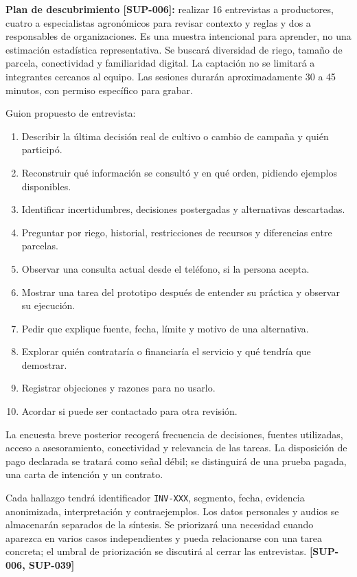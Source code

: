 \documentclass[10pt,a4paper]{article}
\begin{document}
\textbf{Plan de descubrimiento [SUP-006]:} realizar 16 entrevistas a productores, cuatro a especialistas agronómicos para revisar contexto y reglas y dos a responsables de organizaciones. Es una muestra intencional para aprender, no una estimación estadística representativa. Se buscará diversidad de riego, tamaño de parcela, conectividad y familiaridad digital. La captación no se limitará a integrantes cercanos al equipo. Las sesiones durarán aproximadamente 30 a 45 minutos, con permiso específico para grabar.


Guion propuesto de entrevista:


\begin{enumerate}
\item Describir la última decisión real de cultivo o cambio de campaña y quién participó.
\item Reconstruir qué información se consultó y en qué orden, pidiendo ejemplos disponibles.
\item Identificar incertidumbres, decisiones postergadas y alternativas descartadas.
\item Preguntar por riego, historial, restricciones de recursos y diferencias entre parcelas.
\item Observar una consulta actual desde el teléfono, si la persona acepta.
\item Mostrar una tarea del prototipo después de entender su práctica y observar su ejecución.
\item Pedir que explique fuente, fecha, límite y motivo de una alternativa.
\item Explorar quién contrataría o financiaría el servicio y qué tendría que demostrar.
\item Registrar objeciones y razones para no usarlo.
\item Acordar si puede ser contactado para otra revisión.
\end{enumerate}

La encuesta breve posterior recogerá frecuencia de decisiones, fuentes utilizadas, acceso a asesoramiento, conectividad y relevancia de las tareas. La disposición de pago declarada se tratará como señal débil; se distinguirá de una prueba pagada, una carta de intención y un contrato.


Cada hallazgo tendrá identificador \texttt{INV-XXX}, segmento, fecha, evidencia anonimizada, interpretación y contraejemplos. Los datos personales y audios se almacenarán separados de la síntesis. Se priorizará una necesidad cuando aparezca en varios casos independientes y pueda relacionarse con una tarea concreta; el umbral de priorización se discutirá al cerrar las entrevistas. \textbf{[SUP-006, SUP-039]}
\end{document}
